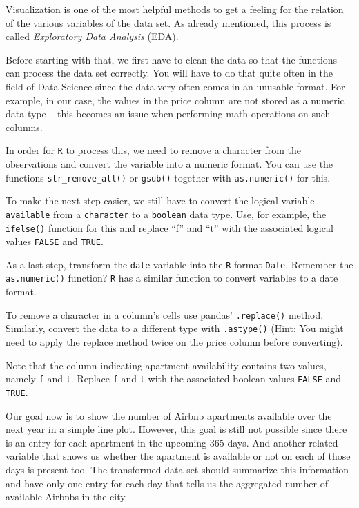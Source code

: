 \documentclass[
  11pt,
]{article}
\newenvironment{tips}[1]
  {
  \begin{itemize}
  \footnotesize
  \renewcommand{\labelitemi}{
    \raisebox{-.7\height}[0pt][0pt]{
      {\setkeys{Gin}{width=3em,keepaspectratio}
        \texttt{[image: images/\#1.png]}}
    }
  }
  \setlength{\fboxsep}{1em}
  \begin{rbox}
  \item
  }
  {
  \end{rbox}
  \end{itemize}
  }
\newenvironment{tipsp}[1]
  {
  \begin{itemize}
  \footnotesize
  \renewcommand{\labelitemi}{
    \raisebox{-.7\height}[0pt][0pt]{
      {\setkeys{Gin}{width=3em,keepaspectratio}
        \texttt{[image: images/\#1.png]}}
    }
  }
  \setlength{\fboxsep}{1em}
  \begin{pbox}
  \item
  }
  {
  \end{pbox}
  \end{itemize}
  }
\begin{document}
Visualization is one of the most helpful methods to get a feeling for the relation of the various variables of the data set.
As already mentioned, this process is called \emph{Exploratory Data Analysis} (EDA).

Before starting with that, we first have to clean the data so that the functions can process the data set correctly.
You will have to do that quite often in the field of Data Science since the data very often comes in an unusable format.
For example, in our case, the values in the price column are not stored as a numeric data type -- this becomes an issue when performing math operations on such columns.

\begin{tips}r
In order for \texttt{R} to process this, we need to remove a character from the observations and convert the variable into a numeric format.
You can use the functions \texttt{str\_remove\_all()} or \texttt{gsub()} together with \texttt{as.numeric()} for this.

To make the next step easier, we still have to convert the logical variable \texttt{available} from a \texttt{character} to a \texttt{boolean} data type.
Use, for example, the \texttt{ifelse()} function for this and replace ``f'' and ``t'' with the associated logical values \texttt{FALSE} and \texttt{TRUE}.

As a last step, transform the \texttt{date} variable into the \texttt{R} format \texttt{Date}.
Remember the \texttt{as.numeric()} function?
\texttt{R} has a similar function to convert variables to a date format.

\end{tips}

\begin{tipsp}p
To remove a character in a column's cells use pandas' \texttt{.replace()} method.
Similarly, convert the data to a different type with \texttt{.astype()} (Hint: You might need to apply the replace method twice on the price column before converting).

Note that the column indicating apartment availability contains two values, namely \texttt{f} and \texttt{t}.
Replace \texttt{f} and \texttt{t} with the associated boolean values \texttt{FALSE} and \texttt{TRUE}.

\end{tipsp}

Our goal now is to show the number of Airbnb apartments available over the next year in a simple line plot.
However, this goal is still not possible since there is an entry for each apartment in the upcoming 365 days.
And another related variable that shows us whether the apartment is available or not on each of those days is present too.
The transformed data set should summarize this information and have only one entry for each day that tells us the aggregated number of available Airbnbs in the city.
\end{document}
